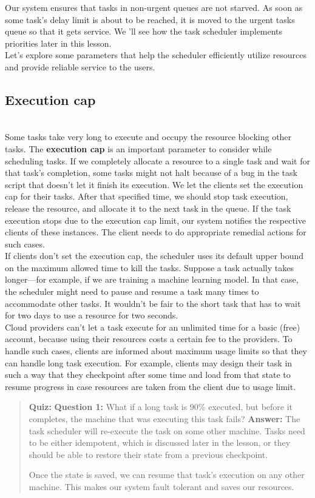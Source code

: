 Our system ensures that tasks in non-urgent queues are not starved. As soon as some task's delay limit is about to be reached, it is moved to the urgent tasks queue so that it gets service. We 'll see how the task scheduler implements priorities later in this lesson.
\\
Let's explore some parameters that help the scheduler efficiently utilize resources and provide reliable service to the users.

\subsection{Execution cap}\label{hna1b4aM2Yd9h_o-RgoC1}
\\
Some tasks take very long to execute and occupy the resource blocking other tasks. The \textbf{execution cap} is an important parameter to consider while scheduling tasks. If we completely allocate a resource to a single task and wait for that task's completion, some tasks might not halt because of a bug in the task script that doesn't let it finish its execution. We let the clients set the execution cap for their tasks. After that specified time, we should stop task execution, release the resource, and allocate it to the next task in the queue. If the task execution stops due to the execution cap limit, our system notifies the respective clients of these instances. The client needs to do appropriate remedial actions for such cases.
\\
If clients don't set the execution cap, the scheduler uses its default upper bound on the maximum allowed time to kill the tasks. Suppose a task actually takes longer---for example, if we are training a machine learning model. In that case, the scheduler might need to pause and resume a task many times to accommodate other tasks. It wouldn't be fair to the short task that has to wait for two days to use a resource for two seconds.
\\
Cloud providers can't let a task execute for an unlimited time for a basic (free) account, because using their resources costs a certain fee to the providers. To handle such cases, clients are informed about maximum usage limits so that they can handle long task execution. For example, clients may design their task in such a way that they checkpoint after some time and load from that state to resume progress in case resources are taken from the client due to usage limit.

\begin{quote}
\textbf{Quiz:}
\textbf{Question 1:} What if a long task is 90\% executed, but before it completes, the machine that was executing this task fails?
\textbf{Answer:} The task scheduler will re-execute the task on some other machine. Tasks need to be either idempotent, which is discussed later in the lesson, or they should be able to restore their state from a previous checkpoint.

Once the state is saved, we can resume that task's execution on any other machine. This makes our system fault tolerant and saves our resources.
\end{quote}

